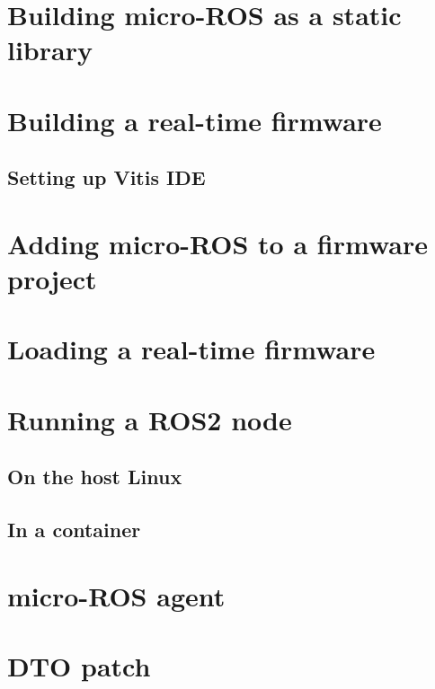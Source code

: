 \documentclass[10pt]{article}
\begin{document}
\section{Building micro-ROS as a static library}
\label{sec:orgc1953f0}

\section{Building a real-time firmware}
\label{sec:org8e73e48}

\subsection{Setting up Vitis IDE}
\label{sec:orge2b32bc}

\section{Adding micro-ROS to a firmware project}
\label{sec:org894b116}

\section{Loading a real-time firmware}
\label{sec:org8bcde3b}

\section{Running a ROS2 node}
\label{sec:orga12f3f9}

\subsection{On the host Linux}
\label{sec:org60c4145}

\subsection{In a container}
\label{sec:orgaa21bdc}

\section{micro-ROS agent}
\label{sec:org2ef27f6}

\pagebreak
\appendix
\section{DTO patch}
\label{sec:org6b3256d}
\inputminted[linenos, frame=single]{diff}{./src/system.patch}
\end{document}
